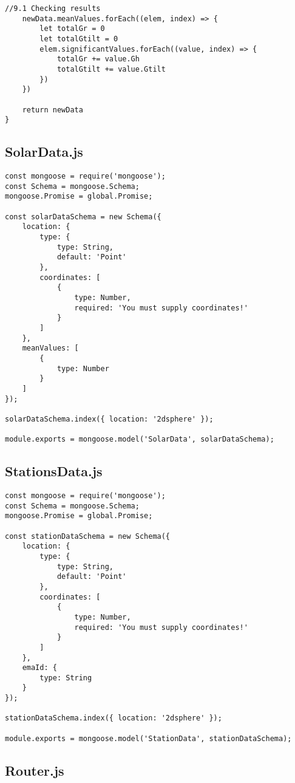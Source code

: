 \begin{lstlisting}[style=ES6, caption={Server/helpers/helpers.js}]
	//9.1 Checking results
	newData.meanValues.forEach((elem, index) => {
		let totalGr = 0
		let totalGtilt = 0
		elem.significantValues.forEach((value, index) => {
			totalGr += value.Gh
			totalGtilt += value.Gtilt
		})
	})

	return newData
}

\end{lstlisting}

\subsection{SolarData.js}

\begin{lstlisting}[style=ES6, caption={Server/models/SolarData.js}]
const mongoose = require('mongoose');
const Schema = mongoose.Schema;
mongoose.Promise = global.Promise;

const solarDataSchema = new Schema({
	location: {
		type: {
			type: String,
			default: 'Point'
		},
		coordinates: [
			{
				type: Number,
				required: 'You must supply coordinates!'
			}
		]
	},
	meanValues: [
		{
			type: Number
		}
	]
});

solarDataSchema.index({ location: '2dsphere' });

module.exports = mongoose.model('SolarData', solarDataSchema);
\end{lstlisting}

\subsection{StationsData.js}

\begin{lstlisting}[style=ES6, caption={Server/models/StationsData.js}]
const mongoose = require('mongoose');
const Schema = mongoose.Schema;
mongoose.Promise = global.Promise;

const stationDataSchema = new Schema({
	location: {
		type: {
			type: String,
			default: 'Point'
		},
		coordinates: [
			{
				type: Number,
				required: 'You must supply coordinates!'
			}
		]
	},
	emaId: {
		type: String
	}
});

stationDataSchema.index({ location: '2dsphere' });

module.exports = mongoose.model('StationData', stationDataSchema);
\end{lstlisting}

\subsection{Router.js}

